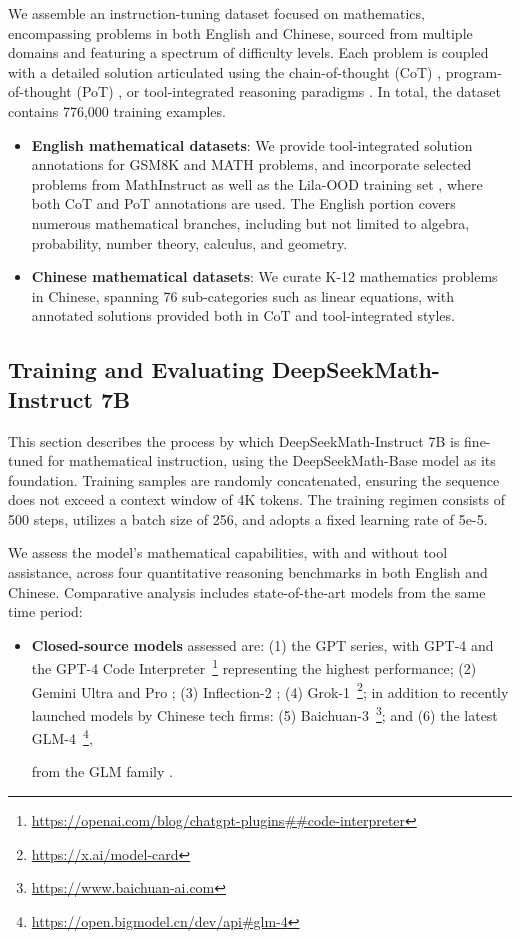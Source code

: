 We assemble an instruction-tuning dataset focused on mathematics, encompassing problems in both English and Chinese, sourced from multiple domains and featuring a spectrum of difficulty levels. Each problem is coupled with a detailed solution articulated using the chain-of-thought (CoT) \citep{cot}, program-of-thought (PoT) \citep{pot,pal}, or tool-integrated reasoning paradigms \citep{tora}. In total, the dataset contains 776,000 training examples.

\begin{itemize}[topsep=0pt]
    \item \textbf{English mathematical datasets}: We provide tool-integrated solution annotations for GSM8K and MATH problems, and incorporate selected problems from MathInstruct \citep{MathInstruct} as well as the Lila-OOD training set \citep{lila}, where both CoT and PoT annotations are used. The English portion covers numerous mathematical branches, including but not limited to algebra, probability, number theory, calculus, and geometry.
    \item \textbf{Chinese mathematical datasets}: We curate K-12 mathematics problems in Chinese, spanning 76 sub-categories such as linear equations, with annotated solutions provided both in CoT and tool-integrated styles.
\end{itemize}

\subsection{Training and Evaluating DeepSeekMath-Instruct 7B}

This section describes the process by which DeepSeekMath-Instruct 7B is fine-tuned for mathematical instruction, using the DeepSeekMath-Base model as its foundation. Training samples are randomly concatenated, ensuring the sequence does not exceed a context window of 4K tokens. The training regimen consists of 500 steps, utilizes a batch size of 256, and adopts a fixed learning rate of 5e-5.

We assess the model’s mathematical capabilities, with and without tool assistance, across four quantitative reasoning benchmarks in both English and Chinese. Comparative analysis includes state-of-the-art models from the same time period:

\begin{itemize}[topsep=0pt]
    \item \textbf{Closed-source models} assessed are: (1) the GPT series, with GPT-4 \citep{gpt4} and the GPT-4 Code Interpreter~\footnote{\url{https://openai.com/blog/chatgpt-plugins\#\#code-interpreter}} representing the highest performance; (2) Gemini Ultra and Pro \citep{gemini}; (3) Inflection-2 \citep{inflection-2}; (4) Grok-1~\footnote{\url{https://x.ai/model-card}}; in addition to recently launched models by Chinese tech firms: (5) Baichuan-3~\footnote{\url{https://www.baichuan-ai.com}}; and (6) the latest GLM-4~\footnote{\url{https://open.bigmodel.cn/dev/api\#glm-4}},

    from the GLM family \citep{glm}.
\end{itemize}

